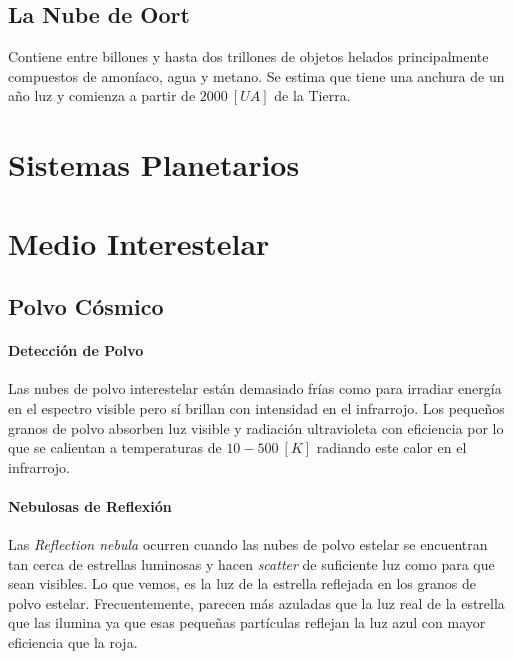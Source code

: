 \documentclass{tufte-handout}
\begin{document}
\subsection{La Nube de Oort}

Contiene entre billones y hasta dos trillones de objetos helados principalmente compuestos de amoníaco, agua y metano. Se estima que tiene una anchura de un año luz y comienza a partir de $2000~[UA]$ de la Tierra.

\clearpage

\section{Sistemas Planetarios}

\clearpage

\section{Medio Interestelar}

\subsection{Polvo Cósmico}

\paragraph{Detección de Polvo}

Las nubes de polvo interestelar están demasiado frías como para irradiar energía en el espectro visible pero sí brillan con intensidad en el infrarrojo. Los pequeños granos de polvo absorben luz visible y radiación ultravioleta con eficiencia por lo que se calientan a temperaturas de $10-500~[K]$ radiando este calor en el infrarrojo.

\paragraph{Nebulosas de Reflexión}

Las \emph{Reflection nebula} ocurren cuando las nubes de polvo estelar se encuentran tan cerca de estrellas luminosas y hacen \emph{scatter} de suficiente luz como para que sean visibles. Lo que vemos, es la luz de la estrella reflejada en los granos de polvo estelar. Frecuentemente, parecen más azuladas que la luz real de la estrella que las ilumina ya que esas pequeñas partículas reflejan la luz azul con mayor eficiencia que la roja.
\end{document}
